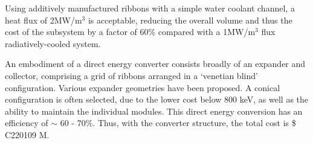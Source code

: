 Using additively manufactured ribbons with a simple water coolant channel, a heat flux of 2MW/m$^3$ is acceptable, reducing the overall volume and thus the cost of the subsystem by a factor of 60\% compared with a 1MW/m$^3$ flux radiatively-cooled system.\\


\begin{table}[ht]
    \centering
    \caption{Cost Table}
    \label{tab:cost-table}
\end{table}

An embodiment of a direct energy converter consists broadly of an expander and collector, comprising a grid of ribbons arranged in a `venetian blind' configuration.
Various expander geometries have been proposed.
A conical configuration is often selected, due to the lower cost below 800 keV, as well as the ability to maintain the individual modules.
This direct energy conversion has an efficiency of $\sim$ 60 - 70\%.
Thus, with the converter structure, the total cost is \$ C220109 M.

